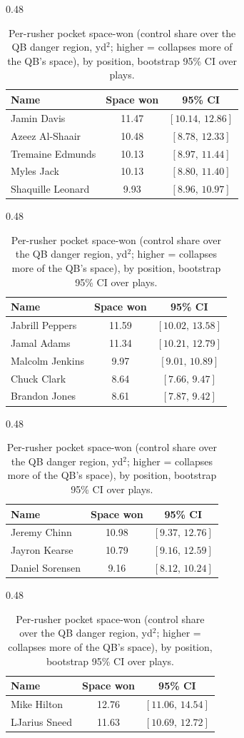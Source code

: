 \begin{table}[h!]
\centering
\begin{subtable}{0.48\textwidth}
\centering
\footnotesize
\begin{tabular}{lcc}
\toprule
Name & Space won & 95\% CI \\
\midrule
Jamin Davis & 11.47 & $[10.14,\,12.86]$ \\
Azeez Al-Shaair & 10.48 & $[8.78,\,12.33]$ \\
Tremaine Edmunds & 10.13 & $[8.97,\,11.44]$ \\
Myles Jack & 10.13 & $[8.80,\,11.40]$ \\
Shaquille Leonard & 9.93 & $[8.96,\,10.97]$ \\
\bottomrule
\end{tabular}
\caption{MLB}
\end{subtable}
\hfill
\begin{subtable}{0.48\textwidth}
\centering
\footnotesize
\begin{tabular}{lcc}
\toprule
Name & Space won & 95\% CI \\
\midrule
Jabrill Peppers & 11.59 & $[10.02,\,13.58]$ \\
Jamal Adams & 11.34 & $[10.21,\,12.79]$ \\
Malcolm Jenkins & 9.97 & $[9.01,\,10.89]$ \\
Chuck Clark & 8.64 & $[7.66,\,9.47]$ \\
Brandon Jones & 8.61 & $[7.87,\,9.42]$ \\
\bottomrule
\end{tabular}
\caption{SS}
\end{subtable}

\bigskip
\begin{subtable}{0.48\textwidth}
\centering
\footnotesize
\begin{tabular}{lcc}
\toprule
Name & Space won & 95\% CI \\
\midrule
Jeremy Chinn & 10.98 & $[9.37,\,12.76]$ \\
Jayron Kearse & 10.79 & $[9.16,\,12.59]$ \\
Daniel Sorensen & 9.16 & $[8.12,\,10.24]$ \\
\bottomrule
\end{tabular}
\caption{FS}
\end{subtable}
\hfill
\begin{subtable}{0.48\textwidth}
\centering
\footnotesize
\begin{tabular}{lcc}
\toprule
Name & Space won & 95\% CI \\
\midrule
Mike Hilton & 12.76 & $[11.06,\,14.54]$ \\
LJarius Sneed & 11.63 & $[10.69,\,12.72]$ \\
\bottomrule
\end{tabular}
\caption{CB}
\end{subtable}

\bigskip
\caption{Per-rusher pocket space-won (control share over the QB danger region, yd$^2$; higher = collapses more of the QB's space), by position, bootstrap 95\% CI over plays.}
\label{tab:pocket_rusher_space}
\end{table}

